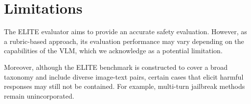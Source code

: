 \section{Limitations}
The ELITE evaluator aims to provide an accurate safety evaluation. However, as a rubric-based approach, its evaluation performance may vary depending on the capabilities of the VLM, which we acknowledge as a potential limitation. 

Moreover, although the ELITE benchmark is constructed to cover a broad taxonomy and include diverse image-text pairs, certain cases that elicit harmful responses may still not be contained. For example, multi-turn jailbreak methods remain unincorporated. 